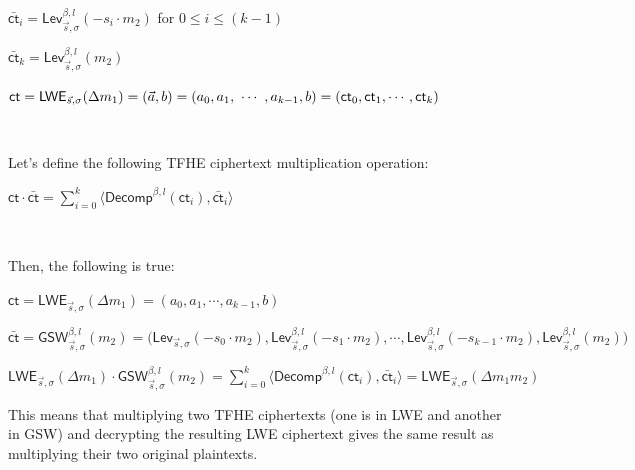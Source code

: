 $\bar{\textsf{ct}}_i = \textsf{Lev}_{\vec{s}, \sigma}^{\beta, l}(-s_i \cdot m_2)$ for $0 \leq i \leq (k-1)$

$\bar{\textsf{ct}}_k = \textsf{Lev}_{\vec{s}, \sigma}^{\beta, l}(m_2)$

$\textsf{ct} = \textsf{LWE}_{\vec{s}, \sigma}(\Delta m_1) = (\vec{a}, b) = (a_0, a_1, \text{ } \text{$\cdots$} \text{ }, a_{k-1}, b) = (\textsf{ct}_0, \textsf{ct}_1, \cdots, \textsf{ct}_k)$

$ $

\noindent Let's define the following TFHE ciphertext multiplication operation: 

$\textsf{ct} \cdot {\bar{\textsf{ct}}} = \sum\limits_{i=0}^{k}\langle \textsf{Decomp}^{\beta, l}(\textsf{ct}_i), \bar{\textsf{ct}}_i \rangle$

$ $

\noindent Then, the following is true:

\begin{tcolorbox}[title={\textbf{\tboxlabel{\ref*{subsec:tfhe-mult-cipher}} TFHE Ciphertext-to-Ciphertext Multiplication}}]
$\textsf{ct} = \textsf{LWE}_{\vec{s}, \sigma}(\Delta m_1) = (a_0, a_1, \cdots, a_{k-1}, b)$

$\bar{\textsf{ct}} = \textsf{GSW}_{\vec{s}, \sigma}^{\beta, l}(m_2) = \bm( \textsf{Lev}_{\vec{s}, \sigma}(-s_0\cdot m_2), \textsf{Lev}_{\vec{s}, \sigma}^{\beta, l}(-s_1\cdot m_2), \cdots, \textsf{Lev}_{\vec{s}, \sigma}^{\beta, l}(-s_{k-1}\cdot m_2), \textsf{Lev}_{\vec{s}, \sigma}^{\beta, l}(m_2)  \bm)$

$\textsf{LWE}_{\vec{s}, \sigma}(\Delta m_1) \cdot \textsf{GSW}_{\vec{s}, \sigma}^{\beta, l}(m_2) = \sum\limits_{i=0}^{k}\langle \textsf{Decomp}^{\beta, l}(\textsf{ct}_i), \bar{\textsf{ct}}_i \rangle = \textsf{LWE}_{\vec{s}, \sigma}(\Delta m_1 m_2)$
\end{tcolorbox}

This means that multiplying two TFHE ciphertexts (one is in LWE and another in GSW) and decrypting the resulting LWE ciphertext gives the same result as multiplying their two original plaintexts. 


